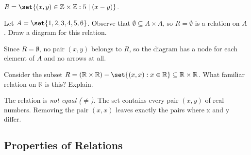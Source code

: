 \documentclass[DIN, pagenumber=false, fontsize=11pt, parskip=half]{scrartcl}
\begin{document}
\begin{problems}
    \answer $R = \set{(x,y) \in \mathbb{Z} \times \mathbb{Z} : 5 \mid (x-y)}$.

    \problem Let $A = \set{1,2,3,4,5,6}$. Observe that $\emptyset \subseteq A \times A$, so $R = \emptyset$ is a relation on $A$. Draw a diagram for this relation.

    \answer Since $R = \emptyset$, no pair $(x,y)$ belongs to $R$, so the diagram has a node for each element of $A$ and no arrows at all.
    \begin{center}
    \end{center}

    \problem Consider the subset $R = (\mathbb{R} \times \mathbb{R}) - \set{(x,x) : x \in \mathbb{R}} \subseteq \mathbb{R} \times \mathbb{R}$. What familiar relation on $\mathbb{R}$ is this? Explain.

    \answer The relation is \textit{not equal ($\neq$)}. The set contains every pair $(x,y)$ of real numbers. Removing the pair $(x,x)$ leaves exactly the pairs where x and y differ. 
\end{problems}

\subsection{Properties of Relations}
\end{document}
